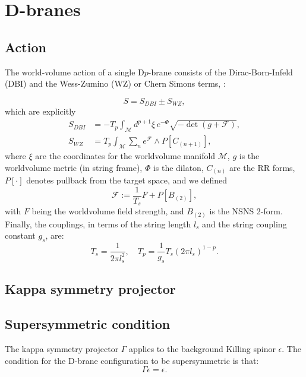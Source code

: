 \section{D-branes}

\subsection{Action}
The world-volume action of a single D$p$-brane consists of the Dirac-Born-Infeld (DBI) and the Wess-Zumino (WZ) or Chern Simons terms, \cite{Ammon:2015wua}:

\begin{equation}
 S = S_{DBI} \pm S_{WZ},
\end{equation}
which are explicitly
\begin{align}
 S_{DBI} & = 
 -T_p \int_\mathcal{M} d^{p+1}\xi \, e^{-\Phi } \sqrt{-\det (g+\mathcal{F})},\\
 S_{WZ} & =
 T_p\int _\mathcal{M} \sum_n e^{\mathcal{F}}\wedge P[C_{(n+1)}],
\end{align}
where $\xi$ are the coordinates for the worldvolume manifold $\mathcal{M}$, $g$ is the worldvolume metric (in string frame), $\Phi$ is the dilaton, $C_{(n)}$ are the RR forms, $P[\cdot]$ denotes pullback from the target space, and we defined
\begin{equation}
 \mathcal{F} := \frac{1}{T_s} F + P[B_{(2)}], 
\end{equation}
with $F$ being the worldvolume field strength, and $B_{(2)}$ is the NSNS 2-form. Finally, the couplings, in terms of the string length $l_s$ and the string coupling constant $g_s$, are:
\begin{equation}
 T_{s} = \dfrac{1}{2\pi l_s^2}, \quad T_p = \dfrac{1}{g_s} T_s (2\pi l_s)^{1-p}.
\end{equation}


\subsection{Kappa symmetry projector}



\subsection{Supersymmetric condition}
The kappa symmetry projector $\Gamma$ applies to the background Killing spinor $\epsilon$. The condition for the D-brane configuration to be supersymmetric is that:
\begin{equation}
 \Gamma \epsilon = \epsilon.
\end{equation}


